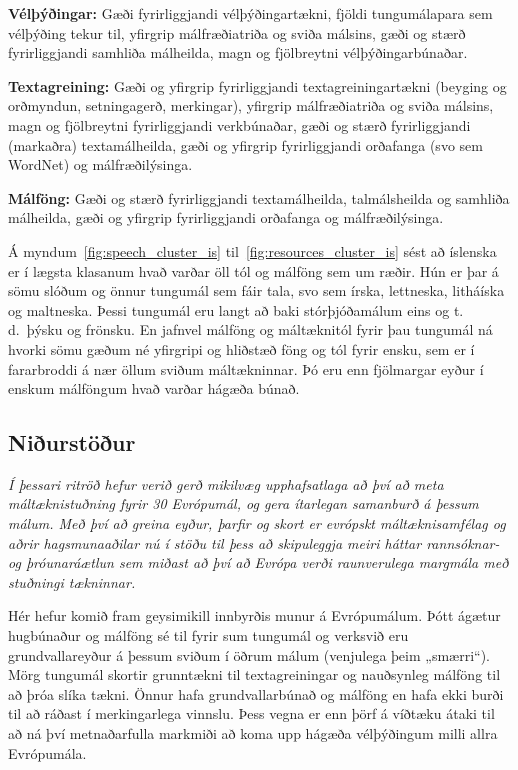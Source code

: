 \begin{multicols}{2}
\textbf{Vélþýðingar:} Gæði fyrirliggjandi vélþýðingartækni, fjöldi tungumálapara sem vélþýðing tekur til, yfirgrip málfræðiatriða og sviða málsins, gæði og stærð fyrirliggjandi samhliða málheilda, magn og fjölbreytni vélþýðingarbúnaðar.

\textbf{Textagreining:} Gæði og yfirgrip fyrirliggjandi textagreiningartækni (beyging og orðmyndun, setningagerð, merkingar), yfirgrip málfræðiatriða og sviða málsins, magn og fjölbreytni fyrirliggjandi verkbúnaðar, gæði og stærð fyrirliggjandi (markaðra) textamálheilda, gæði og yfirgrip fyrirliggjandi orðafanga (svo sem WordNet) og málfræðilýsinga.

\textbf{Málföng:} Gæði og stærð fyrirliggjandi textamálheilda, talmálsheilda og samhliða málheilda, gæði og yfirgrip fyrirliggjandi orðafanga og málfræðilýsinga. 

\bigskip
Á myndum~\ref{fig:speech_cluster_is} til~\ref{fig:resources_cluster_is} sést að íslenska er í lægsta klasanum hvað varðar öll tól og málföng sem um ræðir. Hún er þar á sömu slóðum og önnur tungumál sem fáir tala, svo sem írska, lettneska, litháíska og maltneska. Þessi tungumál eru langt að baki stórþjóðamálum eins og t.\,d.~þýsku og frönsku. En jafnvel málföng og máltæknitól fyrir þau tungumál ná hvorki sömu gæðum né yfirgripi og hliðstæð föng og tól fyrir ensku, sem er í fararbroddi á nær öllum sviðum máltækninnar. Þó eru enn fjölmargar eyður í enskum málföngum hvað varðar hágæða búnað.
\vfill

\subsection{Niðurstöður}

\emph{Í þessari ritröð hefur verið gerð mikilvæg upphafsatlaga að því að meta máltæknistuðning fyrir 30 Evrópumál, og gera ítarlegan samanburð á þessum málum. Með því að greina eyður, þarfir og skort er evrópskt máltæknisamfélag og aðrir hagsmunaaðilar nú í stöðu til þess að skipuleggja meiri háttar rannsóknar- og þróunaráætlun sem miðast að því að Evrópa verði raunverulega margmála með stuðningi tækninnar.}

Hér hefur komið fram geysimikill innbyrðis munur á Evrópumálum. Þótt ágætur hugbúnaður og málföng sé til fyrir sum tungumál og verksvið eru grundvallareyður á þessum sviðum í öðrum málum (venjulega þeim „smærri“). Mörg tungumál skortir grunntækni til textagreiningar og nauðsynleg málföng til að þróa slíka tækni. Önnur hafa grundvallarbúnað og málföng en hafa ekki burði til að ráðast í merkingarlega vinnslu. Þess vegna er enn þörf á víðtæku átaki til að ná því metnaðarfulla markmiði að koma upp hágæða vélþýðingum milli allra Evrópumála.


\end{multicols}
